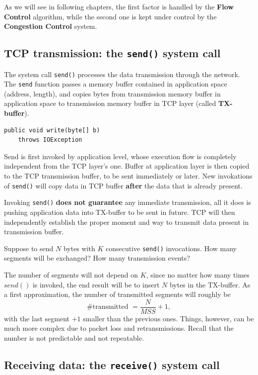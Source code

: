 \documentclass[10pt]{book}
\begin{document}
As we will see in following chapters, the first factor is handled by the
\textbf{Flow Control} algorithm, while the second one is kept under control by
the \textbf{Congestion Control} system.

\subsection{TCP transmission: the \texttt{send()} system call}

The system call \texttt{send()} processes the data transmission through the
network. The \texttt{send} function passes a memory buffer contained in
application space (address, length), and copies bytes from transmission memory
buffer in application space to transmission memory buffer in TCP layer (called
\textbf{TX-buffer}).

\begin{lstlisting}
public void write(byte[] b)
	throws IOException
\end{lstlisting}

Send is first invoked by application level, whose execution flow is completely
independent from the TCP layer's one. Buffer at application layer is then
copied to the TCP transmission buffer, to be sent immediately or later. New
invokations of \texttt{send()} will copy data in TCP buffer \textbf{after} the
data that is already present.

Invoking \texttt{send()} \textbf{does not guarantee} any immediate transmission, all it
does is pushing application data into TX-buffer to be sent in future. TCP will
then independently establish the proper moment and way to transmit data present
in transmission buffer.

Suppose to send $N$ bytes with $K$ consecutive \texttt{send()} invocations. How
many segments will be exchanged? How many transmission events?

The number of segments will not depend on $K$, since no matter how many times
$send()$ is invoked, the end result will be to insert $N$ bytes in the TX-buffer.
As a first approximation, the number of transmitted segments will roughly be
$$\mbox{\#transmitted } = \frac{N}{MSS} + 1,$$ with the last segment $+1$
smaller than the previous ones. Things, however, can be much more complex due
to packet loss and retransmissions. Recall that the number is not predictable
and not repeatable.

\subsection{Receiving data: the \texttt{receive()} system call}
\end{document}

